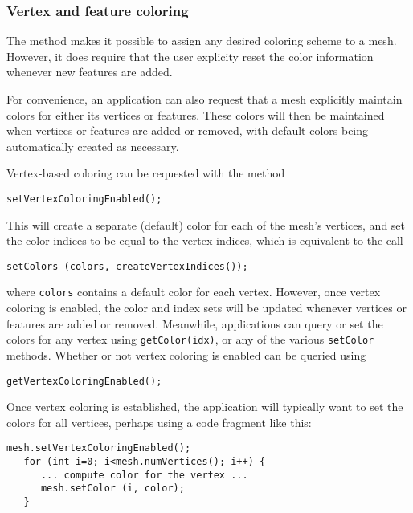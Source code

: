 \subsubsection{Vertex and feature coloring}
\label{vertexAndFeatureColoring:sec}

The method  makes
it possible to assign any desired coloring scheme to a mesh. However,
it does require that the user explicity reset the color information
whenever new features are added.

For convenience, an application can also request that a mesh
explicitly maintain colors for either its vertices or features.  These
colors will then be maintained when vertices or features are added or
removed, with default colors being automatically created as necessary.

Vertex-based coloring can be requested with the method
%
\begin{lstlisting}[]
   setVertexColoringEnabled();
\end{lstlisting}
%
This will create a separate (default) color for each of the mesh's
vertices, and set the color indices to be equal to the vertex indices,
which is equivalent to the call
%
\begin{lstlisting}[]
   setColors (colors, createVertexIndices());
\end{lstlisting}
%
where {\tt colors} contains a default color for each
vertex. However, once vertex coloring is enabled, the color and index
sets will be updated whenever vertices or features are added or
removed. Meanwhile, applications can query or set the colors
for any vertex using {\tt getColor(idx)}, or any of the
various {\tt setColor} methods.
Whether or not vertex coloring
is enabled can be queried using
%
\begin{lstlisting}[]
   getVertexColoringEnabled();
\end{lstlisting}
%
Once vertex coloring is established, the application will typically
want to set the colors for all vertices, perhaps using a code fragment
like this:
%
\begin{lstlisting}[]
   mesh.setVertexColoringEnabled();
   for (int i=0; i<mesh.numVertices(); i++) {
      ... compute color for the vertex ...
      mesh.setColor (i, color);
   }
\end{lstlisting}
%


